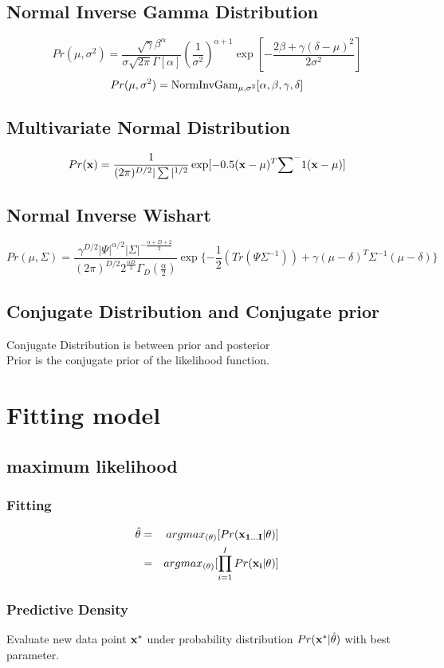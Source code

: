 \documentclass[12pt,a4paper]{article}
\begin{document}
\subsection*{Normal Inverse Gamma Distribution}
$$
Pr(\mu,\sigma^2) = \frac{\sqrt{\gamma}\beta^{\alpha}}{\sigma\sqrt{2\pi}\Gamma[\alpha]}(\frac{1}{\sigma^2})^{\alpha+1}\exp[-\frac{2\beta+\gamma(\delta-\mu)^2}{2\sigma^2}]
$$
$$
Pr(\mu,\sigma^2) = {\rm NormInvGam}_{\mu,\sigma^2}[\alpha,\beta,\gamma,\delta]
$$
\subsection*{Multivariate Normal Distribution}
$$
Pr({\bf x})=\frac{1}{(2\pi)^{D/2}|\sum|^{1/2}}\exp[-0.5({\bf x- \mu})^T{\sum}^-1(\bf x-\mu)]
$$
\subsection*{Normal Inverse Wishart}
$$
Pr(\mu,\Sigma) = \frac{\gamma^{D/2}|\Psi|^{\alpha/2}|\Sigma|^{-\frac{\alpha+D+2}{2}}}{(2\pi)^{D/2}2^{\frac{\alpha D}{2}}\Gamma_D(\frac{\alpha}{2})}\exp\{-\frac{1}{2}(Tr(\Psi\Sigma^{-1}))+\gamma(\mu-\delta)^T\Sigma^{-1}(\mu-\delta)\}
$$
\subsection*{Conjugate Distribution and Conjugate prior}
Conjugate Distribution is between prior and posterior\\
Prior is the conjugate prior of the likelihood function.
\section{Fitting model}
\subsection*{maximum likelihood}
\subsubsection*{Fitting}
\begin{eqnarray*}
\hat{\theta} &=& argmax_{(\theta)}[Pr({\bf x_{1\ldots I}}|\theta)] \\
&=& argmax_{(\theta)}[\prod_{i=1}^{I}Pr({\bf x_{i}}|\theta)]
\end{eqnarray*}
\subsubsection*{Predictive Density}
Evaluate new data point $\bf x^*$ under probability distribution $Pr({\bf x^*}|\hat{\theta})$ with best parameter.
\end{document}
